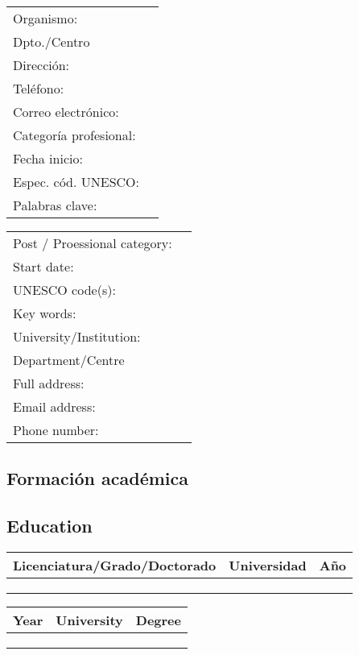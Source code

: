 \documentclass[a4paper]{article}
\def\english{1}
\begin{document}
\ifx\english\undefined
\begin{tabular}{ll}
  Organismo: &  \\
  Dpto./Centro &  \\
  Dirección: &  \\
  Teléfono: &  \\
  Correo electrónico: &  \\
  Categoría profesional: &  \\
  Fecha inicio: &  \\
  Espec. cód. UNESCO: &  \\
  Palabras clave: & 
\end{tabular}
\else
\begin{tabular}{ll}
  Post / Proessional category: &  \\
  Start date: &  \\
  UNESCO code(s): &  \\
  Key words: &  \\
  University/Institution: &  \\
  Department/Centre &  \\
  Full address: &  \\
  Email address: &  \\
  Phone number: & 
\end{tabular}
\fi

\ifx\english\undefined
\subsection{Formación académica}
\else
\subsection{Education}
\fi

\ifx\english\undefined
\begin{tabular}{lll}
  Licenciatura/Grado/Doctorado & Universidad & Año \\
  \hline
   &  &  \\
   &  &  \\
   &  & 
\end{tabular}
\else
\begin{tabular}{lll}
  Year & University & Degree \\
  \hline
   &  &  \\
   &  &  \\
   &  & 
\end{tabular}
\fi
\end{document}

